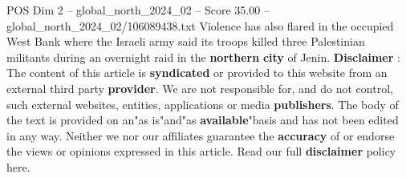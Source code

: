 \begin{textsample}{POS Dim 2 – global\_north\_2024\_02 – Score 35.00 – global\_north\_2024\_02/106089438.txt}
Violence has also flared in the occupied West Bank where the Israeli army said its troops killed three Palestinian militants during an overnight raid in the \textbf{northern} \textbf{city} of Jenin. \textbf{Disclaimer} : The content of this article is \textbf{syndicated} or provided to this website from an external third party \textbf{provider}.
We are not responsible for, and do not control, such external websites, entities, applications or media \textbf{publishers}.
The body of the text is provided on an"as is"and"as \textbf{available}"basis and has not been edited in any way.
Neither we nor our affiliates guarantee the \textbf{accuracy} of or endorse the views or opinions expressed in this article.
Read our full \textbf{disclaimer} policy here.

\end{textsample}
